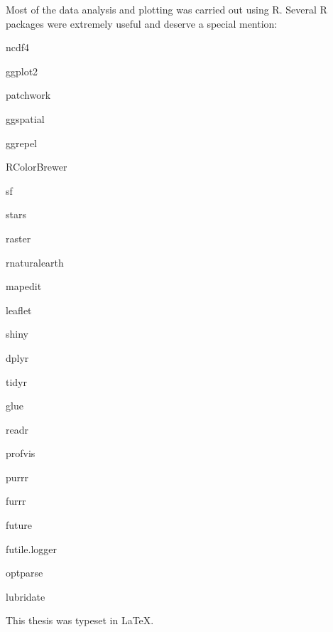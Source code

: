Most of the data analysis and plotting was carried out using R. Several R packages were extremely useful and deserve a special mention:
\begin{multicols}{2}
    \begin{description}
 \item[ncdf4] \citet{ncdf4}
 \item[ggplot2] \citet{ggplot2}
 \item[patchwork] \citet{patchwork}
 \item[ggspatial] \citet{ggspatial}
 \item[ggrepel] \citet{ggrepel}
 \item[RColorBrewer] \citet{RColorBrewer}
 \item[sf] \citet{sf}
 \item[stars] \citet{stars}
 \item[raster] \citet{raster}
 \item[rnaturalearth] \citet{rnaturalearth}
 \item[mapedit] \citet{mapedit}
 \item[leaflet] \citet{leaflet}
 \item[shiny] \citet{shiny}
 \item[dplyr] \citet{dplyr}
 \item[tidyr] \citet{tidyr}
 \item[glue] \citet{glue}
 \item[readr] \citet{readr}
 \item[profvis] \citet{profvis}
 \item[purrr] \citet{purrr}
 \item[furrr] \citet{furrr}
 \item[future] \citet{future}
 \item[futile.logger] \citet{futile.logger}
 \item[optparse] \citet{optparse}
 \item[lubridate] \citet{lubridate}
    \end{description}
\end{multicols}

This thesis was typeset in \LaTeX.
